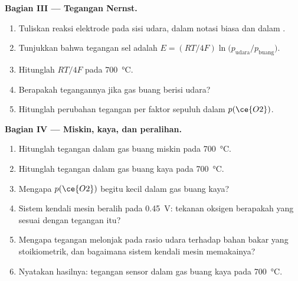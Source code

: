 \begin{problem}
\medskip\noindent\textbf{Bagian III --- Tegangan Nernst.}
\begin{enumerate}[resume, beginpenalty=10000]
  \item Tuliskan reaksi elektrode pada sisi udara, dalam notasi biasa dan dalam
        .
  \item Tunjukkan bahwa tegangan sel adalah $E = (RT/4F)\ln\bigl(p_{\mathrm{udara}}/p_{\mathrm{buang}}\bigr)$.
  \item Hitunglah $RT/4F$ pada \qty{700}{\celsius}.
  \item Berapakah tegangannya jika gas buang berisi udara?
  \item Hitunglah perubahan tegangan per faktor sepuluh dalam $p(\ce{O2})$.
\end{enumerate}

\medskip\noindent\textbf{Bagian IV --- Miskin, kaya, dan peralihan.}
\begin{enumerate}[resume, beginpenalty=10000]
  \item Hitunglah tegangan dalam gas buang miskin pada \qty{700}{\celsius}.
  \item Hitunglah tegangan dalam gas buang kaya pada \qty{700}{\celsius}.
  \item Mengapa $p(\ce{O2})$ begitu kecil dalam gas buang kaya?
  \item Sistem kendali mesin beralih pada \qty{0.45}{V}: tekanan oksigen berapakah yang
        sesuai dengan tegangan itu?
  \item Mengapa tegangan melonjak pada rasio udara terhadap bahan bakar yang stoikiometrik, dan bagaimana
        sistem kendali mesin memakainya?
  \item Nyatakan hasilnya: tegangan sensor dalam gas buang kaya pada \qty{700}{\celsius}.
\end{enumerate}
\end{problem}

